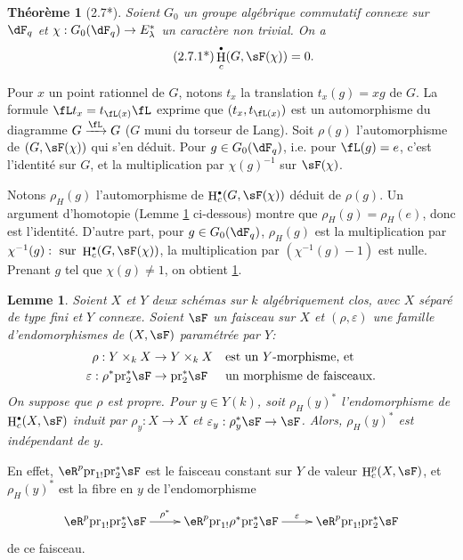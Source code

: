 \documentclass[oneside]{book}
\DeclareMathOperator{\h}{H}
\newcommand{\pr}{\mathrm{pr}} %
\theoremstyle{sga-source}
\theoremstyle{sga-source-dash}
\theoremstyle{sga-source-dotdash}
\theoremstyle{sga-source-number-note-dash}
\theoremstyle{sga-source-note-number-dotdash}
\theoremstyle{sga-source-example-dotdash}
\theoremstyle{sga-source-inline-number}
\theoremstyle{sga-source-bare-number}
\theoremstyle{sga-source}
\newtheorem{lemma_}[subsection]{Lemme}
\newtheorem*{theorem*}{Théorème}
\let\oldbullet\bullet
\renewcommand{\bullet}{\textnormal{\tiny$\oldbullet$}}
\newcommand{\PrintPage}[1]{}\newcommand{\MathPage}[1]{}\newcommand{\PrintCite}[2]{#1}\newcommand{\var}[3]{#2}
\begin{document}
\begin{theorem*}[2.7*]\label{VI:2-7*}
Soient $G_0$ un groupe algébrique commutatif connexe sur $\dF_q$ et 
$\chi:G_0(\dF_q) \to E_\lambda^\ast$ un caractère non trivial. On a 
\begin{align*}\tag{2.7.1*}\label{VI:eq:2-7-1*}
  \h_c^\bullet(G,\sF(\chi)) = 0 \text{.}
\end{align*}
\end{theorem*}

Pour $x$ un point rationnel de $G$, notons $t_x$ la translation $t_x(g) = x g$ 
de $G$. La formule $\fL t_x = t_{\fL(x)} \fL$ exprime que $(t_x,t_{\fL(x)})$ 
est un automorphisme du diagramme $G\xrightarrow\fL G$ ($G$ muni du torseur de 
Lang). Soit $\rho(g)$ l'automorphisme de $(G,\sF(\chi))$ qui s'en déduit. 
Pour $g\in G_0(\dF_q)$, i.e. pour $\fL(g) = e$, c'est l'identité sur $G$, et 
la multiplication par $\chi(g)^{-1}$ sur $\sF(\chi)$. 

Notons $\rho_H(g)$ l'automorphisme de $\h_c^\bullet(G,\sF(\chi))$ déduit de 
$\rho(g)$. Un argument d'homotopie (Lemme \ref{VI:2-8} ci-dessous) montre que 
$\rho_H(g) = \rho_H(e)$, donc est l'identité. D'autre part, pour 
$g\in G_0(\dF_q)$, $\rho_H(g)$ est la multiplication par 
$\var{(\chi^{-1}(g)}{\chi^{-1}(g)}{S45-SOL-0748}:\text{ sur }\var{\h^\bullet(G,\sF(\chi))}{\h_c^\bullet(G,\sF(\chi))}{S45-SOL-0749}$, la multiplication par 
$(\chi^{-1}(g)-1)$ est nulle. Prenant $g$ tel que $\chi(g)\ne 1$, on obtient 
\ref{VI:2-7*}. 





\begin{lemma_}\label{VI:2-8}
Soient $X$ et $Y$ deux schémas sur $k$ algébriquement clos, avec $X$ 
séparé de type fini et $Y$ connexe. Soient $\sF$ un faisceau sur $X$ et 
$(\rho,\varepsilon)$ une famille d'endomorphismes de $(X,\sF)$ paramétrée 
par $Y$: 
\begin{align*} 
  \rho:Y\times_k X &\to Y\times_k X && \text{est un $Y$-morphisme, et} \\
  \varepsilon:\rho^\ast \pr_2^\ast \sF &\to \pr_2^\ast\sF && \text{un morphisme de faisceaux.} 
\end{align*}
On suppose que $\rho$ est propre. Pour $y\in Y(k)$, soit $\rho_H(y)^\ast$ 
l'endomorphisme de $\h_c^\bullet(X,\sF)$ induit par $\rho_y:X\to X$ et 
$\varepsilon_y:\rho_y^\ast\sF\to \sF$. Alors, $\rho_H(y)^\ast$ est 
indépendant de $y$. 
\end{lemma_}

En effet, $\eR^p \pr_{1!} \pr_2^\ast\sF$ est le 
faisceau constant sur $Y$ de valeur \PrintPage{188}
$\var{\h^p(X,\sF)}{\h_c^p(X,\sF)}{S45-SOL-0750}$, et $\rho_H(y)^\ast$ est la 
fibre en $y$ de l'endomorphisme 
\[\xymatrix{
  \eR^p \pr_{1!} \pr_2^\ast \sF \ar[r]^-{\rho^\ast} 
    & \eR^p \pr_{1!} \rho^\ast \pr_2^\ast \sF \ar[r]^-\varepsilon 
    & \eR^p \pr_{1!} \pr_2^\ast \sF 
}\]
de ce faisceau. 
\end{document}
